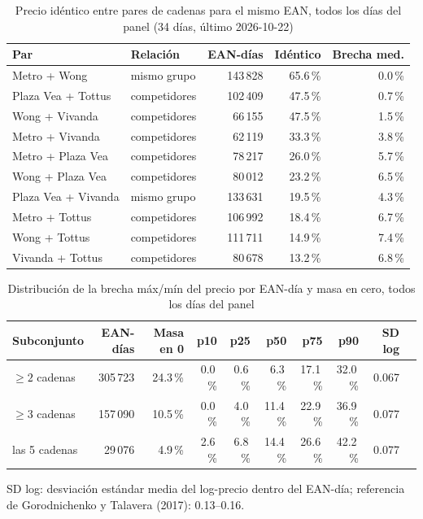 
\begin{table}[htbp]
\caption{Precio id\'entico entre pares de cadenas para el mismo EAN, todos los d\'ias del panel (34 d\'ias, \'ultimo 2026-10-22)}
\label{tab:identidad}
\centering\scriptsize\setlength{\tabcolsep}{3pt}
\begin{tabular}{@{}llrrr@{}}
\toprule
Par & Relaci\'on & EAN-d\'ias & Id\'entico & Brecha med. \\
\midrule
Metro + Wong & mismo grupo & 143\,828 & 65.6\,\% & 0.0\,\% \\
Plaza Vea + Tottus & competidores & 102\,409 & 47.5\,\% & 0.7\,\% \\
Wong + Vivanda & competidores & 66\,155 & 47.5\,\% & 1.5\,\% \\
Metro + Vivanda & competidores & 62\,119 & 33.3\,\% & 3.8\,\% \\
Metro + Plaza Vea & competidores & 78\,217 & 26.0\,\% & 5.7\,\% \\
Wong + Plaza Vea & competidores & 80\,012 & 23.2\,\% & 6.5\,\% \\
Plaza Vea + Vivanda & mismo grupo & 133\,631 & 19.5\,\% & 4.3\,\% \\
Metro + Tottus & competidores & 106\,992 & 18.4\,\% & 6.7\,\% \\
Wong + Tottus & competidores & 111\,711 & 14.9\,\% & 7.4\,\% \\
Vivanda + Tottus & competidores & 80\,678 & 13.2\,\% & 6.8\,\% \\
\bottomrule\end{tabular}\end{table}

\begin{table}[t]
\caption{Distribuci\'on de la brecha m\'ax/m\'in del precio por EAN-d\'ia y masa en cero, todos los d\'ias del panel}
\label{tab:brecha}
\centering\scriptsize\setlength{\tabcolsep}{4pt}
\begin{tabular}{@{}lrrrrrrrrr@{}}
\toprule
Subconjunto & EAN-d\'ias & Masa en 0 & p10 & p25 & p50 & p75 & p90 & SD log \\
\midrule
$\geq 2$ cadenas & 305\,723 & 24.3\,\% & 0.0\,\% & 0.6\,\% & 6.3\,\% & 17.1\,\% & 32.0\,\% & 0.067 \\
$\geq 3$ cadenas & 157\,090 & 10.5\,\% & 0.0\,\% & 4.0\,\% & 11.4\,\% & 22.9\,\% & 36.9\,\% & 0.077 \\
las 5 cadenas & 29\,076 & 4.9\,\% & 2.6\,\% & 6.8\,\% & 14.4\,\% & 26.6\,\% & 42.2\,\% & 0.077 \\
\bottomrule\end{tabular}
\par\smallskip\raggedright\scriptsize SD log: desviaci\'on est\'andar media del log-precio dentro del EAN-d\'ia; referencia de Gorodnichenko y Talavera (2017): 0.13--0.16.
\end{table}

